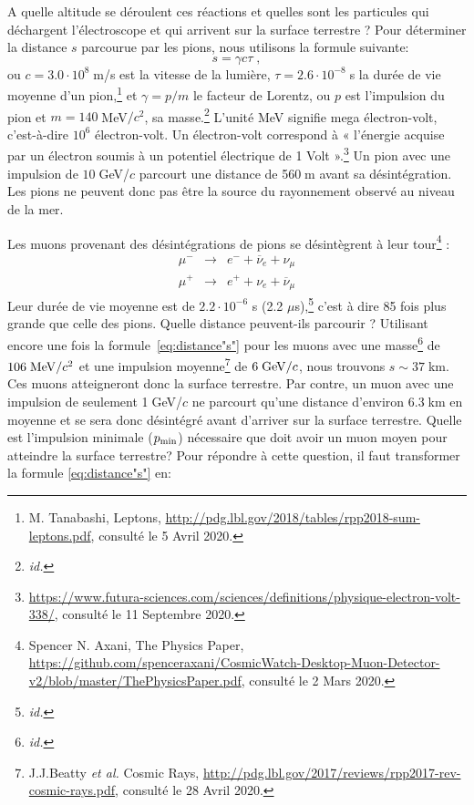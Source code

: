 \documentclass[a4paper, 12pt]{article}
\begin{document}
\begin{spacing}{1.5}
A quelle altitude se déroulent ces réactions et quelles sont les particules qui déchargent l'électroscope et qui arrivent sur la surface terrestre ? Pour déterminer la distance $s$ parcourue par les pions, nous utilisons la formule suivante:
\begin{equation}
s = \gamma c \tau\;, \label{eq:distance"s"}
\end{equation}
ou $c=3.0 \cdot 10^8\;$m/s est la vitesse de la lumière, $\tau=2.6 \cdot 10^{-8}\;$s la durée de vie moyenne d'un pion,\footnote{M. Tanabashi, Leptons, \url{http://pdg.lbl.gov/2018/tables/rpp2018-sum-leptons.pdf}, consulté le 5 Avril 2020.} et $\gamma = p / m$ le facteur de Lorentz, ou $p$ est l'impulsion du pion et $m = 140$$\;$MeV$/c^2$, sa masse.\footnote{\emph{id.}} L'unité MeV signifie mega électron-volt, c'est-à-dire $10^6$ électron-volt. Un électron-volt correspond à « l'énergie acquise par un électron soumis à un potentiel électrique de 1 Volt ».\footnote{\url{https://www.futura-sciences.com/sciences/definitions/physique-electron-volt-338/}, consulté le 11 Septembre 2020.} Un pion avec une impulsion de $10\;$GeV/$c$ parcourt une distance de 560$\;$m avant sa désintégration. Les pions ne peuvent donc pas être la source du rayonnement observé au niveau de la mer. 

Les muons provenant des désintégrations de pions se désintègrent à leur tour\footnote{Spencer N. Axani, The Physics Paper, \url{https://github.com/spenceraxani/CosmicWatch-Desktop-Muon-Detector-v2/blob/master/ThePhysicsPaper.pdf}, consulté le 2 Mars 2020.} :
\begin{eqnarray}
\mu^- &\rightarrow& e^- + {\overline \nu}_e + \nu_\mu \label{eq:mu-d}\\
\mu^+ &\rightarrow& e^+ + \nu_e + {\overline \nu}_\mu \label{eq:mu+d}
\end{eqnarray}
Leur durée de vie moyenne est de $2.2 \cdot 10^{-6}$ s (2.2 $\mu$s),\footnote{\emph{id.}} c'est à dire 85 fois plus grande que celle des pions. Quelle distance peuvent-ils parcourir ? Utilisant encore une fois la formule~\ref{eq:distance"s"} pour les muons avec une masse\footnote{\emph{id.}} de $106\;{\rm MeV}/c^2$ et une impulsion moyenne\footnote{J.J.Beatty \emph{et al.} Cosmic Rays, \url{http://pdg.lbl.gov/2017/reviews/rpp2017-rev-cosmic-rays.pdf}, consulté le 28 Avril 2020.} de $6\;{\rm GeV}/c$, nous trouvons $s\sim37\;$km. Ces muons atteigneront donc la surface terrestre. Par contre, un muon avec une impulsion de seulement 1$\;$GeV/$c$ ne parcourt qu'une distance d'environ 6.3$\;$km en moyenne et se sera donc désintégré avant d'arriver sur la surface terrestre. Quelle est l'impulsion minimale ($p_{\rm min}$) nécessaire que doit avoir un muon moyen pour atteindre la surface terrestre? Pour répondre à cette question, il faut transformer la formule \ref{eq:distance"s"} en:


\end{spacing}
\end{document}
